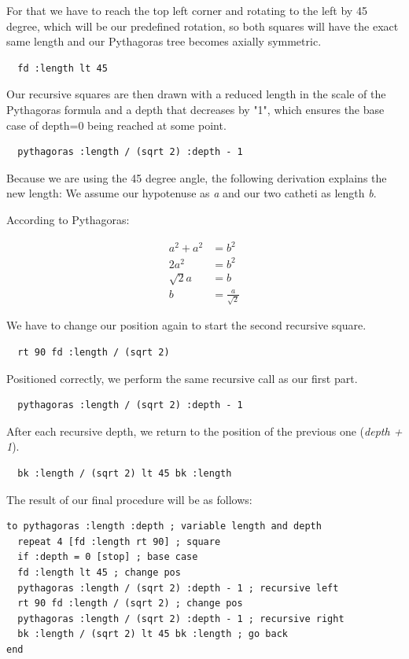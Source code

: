 \documentclass[a4paper, 11pt]{article}
\begin{document}
For that we have to reach the top left corner and rotating to the left by 45 degree, which will be our predefined rotation, so both squares will have the exact same length and our Pythagoras tree becomes axially symmetric.

\begin{lstlisting}
  fd :length lt 45
\end{lstlisting}

Our recursive squares are then drawn with a reduced length in the scale of the Pythagoras formula and a depth that decreases by "1", which ensures the base case of depth=0 being reached at some point.

\begin{lstlisting}
  pythagoras :length / (sqrt 2) :depth - 1
\end{lstlisting}

Because we are using the 45 degree angle, the following derivation explains the new length:
We assume our hypotenuse as \textit{a} and our two catheti as length \textit{b}.

According to Pythagoras:

\begin{align*}
  a^2 + a^2 &= b^2 \\
  2a^2 &= b^2 \\
  \sqrt{2}a &= b \\
  b &= \frac{a}{\sqrt{2}}
\end{align*}

We have to change our position again to start the second recursive square.

\begin{lstlisting}
  rt 90 fd :length / (sqrt 2)
\end{lstlisting}

Positioned correctly, we perform the same recursive call as our first part.

\begin{lstlisting}
  pythagoras :length / (sqrt 2) :depth - 1
\end{lstlisting}

After each recursive depth, we return to the position of the previous one (\textit{depth + 1}).

\begin{lstlisting}
  bk :length / (sqrt 2) lt 45 bk :length
\end{lstlisting}

The result of our final procedure will be as follows:

\begin{lstlisting}[title={Pythagoras tree}]
to pythagoras :length :depth ; variable length and depth
  repeat 4 [fd :length rt 90] ; square
  if :depth = 0 [stop] ; base case
  fd :length lt 45 ; change pos
  pythagoras :length / (sqrt 2) :depth - 1 ; recursive left
  rt 90 fd :length / (sqrt 2) ; change pos
  pythagoras :length / (sqrt 2) :depth - 1 ; recursive right
  bk :length / (sqrt 2) lt 45 bk :length ; go back
end
\end{lstlisting}
\end{document}

